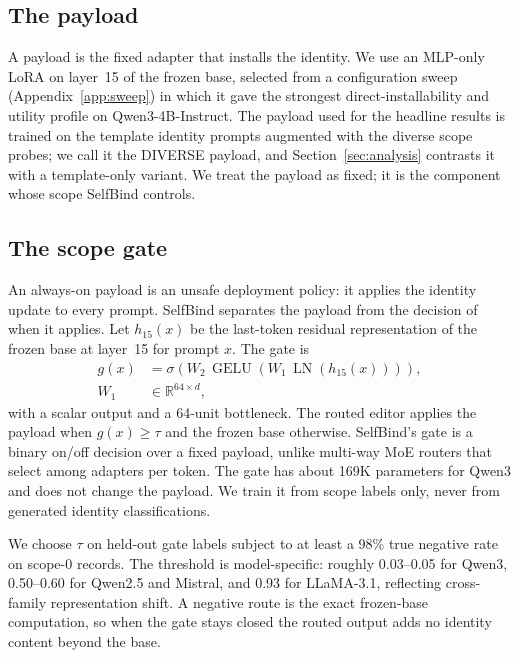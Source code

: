 \documentclass[11pt]{article}
\begin{document}
\subsection{The payload}
A payload is the fixed adapter that installs the identity. We use an MLP-only LoRA on layer~15 of the frozen base, selected from a configuration sweep (Appendix~\ref{app:sweep}) in which it gave the strongest direct-installability and utility profile on Qwen3-4B-Instruct. The payload used for the headline results is trained on the template identity prompts augmented with the diverse scope probes; we call it the DIVERSE payload, and Section~\ref{sec:analysis} contrasts it with a template-only variant. We treat the payload as fixed; it is the component whose scope SelfBind controls.

\subsection{The scope gate}
An always-on payload is an unsafe deployment policy: it applies the identity update to every prompt. SelfBind separates the payload from the decision of when it applies. Let $h_{15}(x)$ be the last-token residual representation of the frozen base at layer~15 for prompt $x$. The gate is
\begin{equation}
\begin{aligned}
g(x)&=\sigma\!\left(W_2\,\operatorname{GELU}(W_1\,\operatorname{LN}(h_{15}(x)))\right),\\
W_1&\in\mathbb{R}^{64\times d},
\end{aligned}
\label{eq:gate}
\end{equation}
with a scalar output and a 64-unit bottleneck. The routed editor applies the payload when $g(x)\geq\tau$ and the frozen base otherwise. SelfBind's gate is a binary on/off decision over a fixed payload, unlike multi-way MoE routers that select among adapters per token. The gate has about 169K parameters for Qwen3 and does not change the payload. We train it from scope labels only, never from generated identity classifications.

We choose $\tau$ on held-out gate labels subject to at least a 98\% true negative rate on scope-0 records. The threshold is model-specific: roughly 0.03--0.05 for Qwen3, 0.50--0.60 for Qwen2.5 and Mistral, and 0.93 for LLaMA-3.1, reflecting cross-family representation shift. A negative route is the exact frozen-base computation, so when the gate stays closed the routed output adds no identity content beyond the base.
\end{document}
